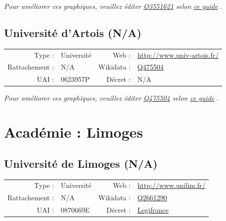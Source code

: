 \documentclass[12pt,french,landscape]{article}
\begin{document}
\textit{\scriptsize Pour améliorer ces graphiques, veuillez éditer \href{https://www.wikidata.org/entity/Q3551621}{Q3551621}  selon \href{https://github.com/cpesr/wikidataESR/blob/master/Rmd/wikidataESR.md}{ce guide}}
.


\newpage

\hypertarget{universituxe9-dartois-na}{%
\subsection{Université d'Artois (N/A)}\label{universituxe9-dartois-na}}

\begin{tabular*}{0.45\textwidth}{rp{2cm}rl}  
\hline  
Type : & Université & Web : &\href{http://www.univ-artois.fr/}{http://www.univ-artois.fr/} \\  
Rattachement : & N/A & Wikidata : & \href{https://www.wikidata.org/entity/Q475504}{Q475504} \\  
UAI : & 0623957P & Décret : & N/A \\  
\hline  
\end{tabular*}

\textit{\scriptsize Pour améliorer ces graphiques, veuillez éditer \href{https://www.wikidata.org/entity/Q475504}{Q475504}  selon \href{https://github.com/cpesr/wikidataESR/blob/master/Rmd/wikidataESR.md}{ce guide}}
.


\newpage

\hypertarget{acaduxe9mie-limoges}{%
\section{Académie : Limoges}\label{acaduxe9mie-limoges}}

\hypertarget{universituxe9-de-limoges-na}{%
\subsection{Université de Limoges
(N/A)}\label{universituxe9-de-limoges-na}}

\begin{tabular*}{0.45\textwidth}{rp{2cm}rl}  
\hline  
Type : & Université & Web : &\href{http://www.unilim.fr/}{http://www.unilim.fr/} \\  
Rattachement : & N/A & Wikidata : & \href{https://www.wikidata.org/entity/Q2661290}{Q2661290} \\  
UAI : & 0870669E & Décret : & \href{https://www.legifrance.gouv.fr/eli/decret/2016/12/15/MENS1630827D/jo/texte/fr}{Legifrance} \\  
\hline  
\end{tabular*}
\end{document}
